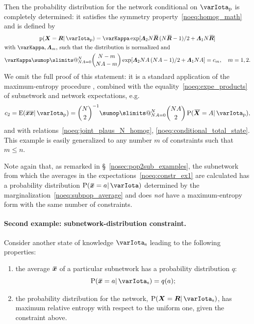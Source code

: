 \documentclass{article}
\makeatletter
\theoremstyle{remark}
\theoremstyle{innote}
\def\sum{\DOTSI\sumop\slimits@}
\newcommand*{\citep}{\parencites}
\renewcommand*{\|}{\mathpunct{|}}%
\renewcommand{\le}{\leqslant}%
\newcommand*{\pf}{\mathrm{p}}%
\newcommand*{\p}{\mathrm{P}}%
\newcommand*{\sect}{\S}%
\newcommand*{\eg}{{e.g.}}
\newcommand*{\E}{\mathrm{E}}
\DeclarePairedDelimiter\expp{(}{)}
\newcommand*{\expe}{\E\expp}%
\theoremstyle{simple}
\newcommand*{\widebar}[1]{{\mkern1.5mu\skew{2}\overline{\mkern-1.5mu#1\mkern-1.5mu}\mkern 1.5mu}}
\newcommand*{\av}{\widebar} %
\newcommand*{\sav}{\widebar} %
\newcommand*{\yxx}{x}%
\newcommand*{\yx}{\bm{\yxx}}%
\newcommand*{\yxs}{\sav{\yx}}%
\newcommand*{\yX}{\bm{X}}%
\newcommand*{\yXf}{\av{\yX}}%
\newcommand*{\yR}{\bm{R}}%
\newcommand*{\yRf}{\av{\yR}}%
\newcommand*{\yH}{\varIota}
\newcommand*{\yHa}{\varIota_\textrm{p}}
\newcommand*{\yHb}{\varIota_\textrm{s}}
\newcommand*{\yL}{\bm{\varLambda}}
\makeatother
\begin{document}
\medskip Then the probability distribution for the network conditional on $\yHa$
is completely determined: it satisfies the symmetry
property~\eqref{noeq:homog_math} and is defined by
\begin{multline}
  \label{noeq:pop_distr_maxent1}
  \pf(\yX =\yR \|\yHa) =
\varKappa\exp[\yL_2 N\yRf\,(N\yRf-1)/2 + \yL_1 N\yRf]
\\
\!\begin{aligned}[b]
&\text{with $\varKappa, \yL_m$, such that the distribution is normalized and}
\\
&\varKappa\sum_{N A=0}^N %
\binom{N-m}{N A-m}
\exp[\yL_2 N A\,(N A-1)/2 + \yL_1 N A]
= c_m, \quad m=1,2.
\end{aligned}
\end{multline}
We omit the full proof of this statement: it is a standard application of
the maximum-entropy procedure
\citep[\eg:][]{jaynes1957,jaynes1963,good1963,jaynes1967,jaynes1979b,vancampenhoutetal1981,sivia1990,fangetal1997,bretthorst2013},
combined with the equality~\eqref{noeq:expe_products} of subnetwork and
network expectations, \eg
\begin{equation}
  \label{noeq:exploit_eq_expects}
  c_2 = \expe{\sav{\yx\yx}\|\yHa} = 
\binom{N}{2}^{-1}
\sum_{N A=0}^N %
\binom{N A}{2} \, \p(\yXf = A\|\yHa),
\end{equation}
and with relations~\eqref{noeq:joint_plaus_N_homog},
\eqref{noeq:conditional_total_state}. This example is easily generalized to
any number $m$ of constraints such that  $m\le n$.

Note again that, as remarked in \sect~\ref{nosec:pop2sub_examples}, the
subnetwork from which the averages in the
expectations~\eqref{noeq:constr_ex1} are calculated has a probability
distribution $\p(\yxs =a \|\yH)$ determined by the
marginalization~\eqref{noeq:subpop_average} and does \emph{not} have a
maximum-entropy form with the same number of constraints.


\paragraph{Second example: subnetwork-distribution constraint.}
\label{nosec:maxent_fullsubpop}
Consider another state of knowledge $\yHb$ leading to the following
properties:
\begin{enumerate}%
\item the average $\yxs$ of a particular
  subnetwork has a probability distribution $q$:
  \begin{equation}
    \label{noeq:constr_subpop_distr}
    \p(\yxs =a \|\yHb) = q(a);
  \end{equation}
\item the probability distribution for the network, $\p(\yX = \yR
  \|\yHb)$, has maximum relative entropy with respect to the uniform
  one, given the constraint above.
\end{enumerate}
\end{document}
